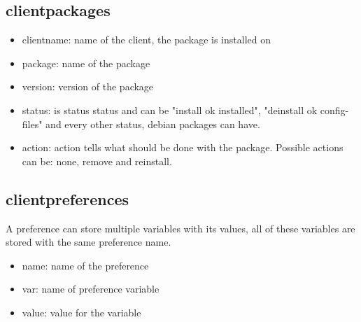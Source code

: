 \subsection{clientpackages}
\begin{itemize}
\item clientname: name of the client, the package is installed on
\item package: name of the package
\item version: version of the package
\item status: is status status and can be "install ok installed", "deinstall ok config-files" and every other status, debian packages can have.
\item action: action tells what should be done with the package. Possible actions can be: none, remove and reinstall.
\end{itemize}

\subsection{clientpreferences}
A preference can store multiple variables with its values, all of these variables are stored with the same preference name.
\begin{itemize}
\item name: name of the preference
\item var: name of preference variable
\item value: value for the variable
\end{itemize}

